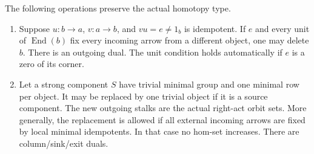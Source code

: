 \begin{lemma}
\label{CP2:A-high-one-sided}
The following operations preserve the actual homotopy type.

\begin{enumerate}
\item Suppose $u:b\to a$, $v:a\to b$, and $vu=e\ne1_b$
is idempotent.  If $e$ and every unit of $\operatorname{End}(b)$
fix every incoming arrow from a different object, one may
delete $b$.  There is an outgoing dual.  The unit condition
holds automatically if $e$ is a zero of its corner.
\item Let a strong component $S$ have trivial minimal group
and one minimal row per object.  It may be replaced by one
trivial object if it is a source component.  The new outgoing
stalks are the actual right-act orbit sets.  More generally,
the replacement is allowed if all external incoming arrows
are fixed by local minimal idempotents.  In that case no
hom-set increases.  There are column/sink/exit duals.
\end{enumerate}
\end{lemma}
